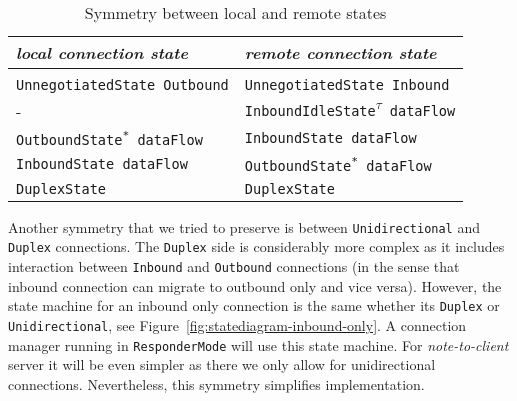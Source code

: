 \documentclass{article}
\def\UnnegotiatedStateOut{\texttt{UnnegotiatedState Outbound}}
\def\UnnegotiatedStateIn{\texttt{UnnegotiatedState Inbound}}
\def\OutboundStateAny{\texttt{OutboundState\textsuperscript{*} dataFlow}}
\def\DuplexState{\texttt{DuplexState}}
\def\InboundStateAny{\texttt{InboundState dataFlow}}
\def\InboundIdleStateAny{\texttt{InboundIdleState\textsuperscript{$\tau$} dataFlow}}
\begin{document}
\begin{table}[h]
  \begin{tabular}[h]{l|l}
    \textit{local connection state} & \textit{remote connection state} \\ [0.3em]
    \hline \\ 
    \UnnegotiatedStateOut{}         & \UnnegotiatedStateIn{}           \\ [0.2em]
    -                               & \InboundIdleStateAny{}           \\ [0.2em]
    \OutboundStateAny{}             & \InboundStateAny{}               \\ [0.2em]
    \InboundStateAny{}              & \OutboundStateAny{}              \\ [0.2em]
    \DuplexState{}                  & \DuplexState{}                   \\ [0.2em]
  \end{tabular}
  \caption{Symmetry between local and remote states}
  \label{table:symmetry}
\end{table}

Another symmetry that we tried to preserve is between \texttt{Unidirectional}
and \texttt{Duplex} connections.  The \texttt{Duplex} side is considerably more
complex as it includes interaction between \texttt{Inbound} and
\texttt{Outbound} connections (in the sense that inbound connection can migrate
to outbound only and vice versa).  However, the state machine for an inbound
only connection is the same whether its \texttt{Duplex} or
\texttt{Unidirectional}, see Figure~\ref{fig:statediagram-inbound-only}.
A connection manager running in \texttt{ResponderMode} will use this state
machine.  For \textit{note-to-client} server it will be even simpler as there
we only allow for unidirectional connections.  Nevertheless, this symmetry
simplifies implementation.
\end{document}
